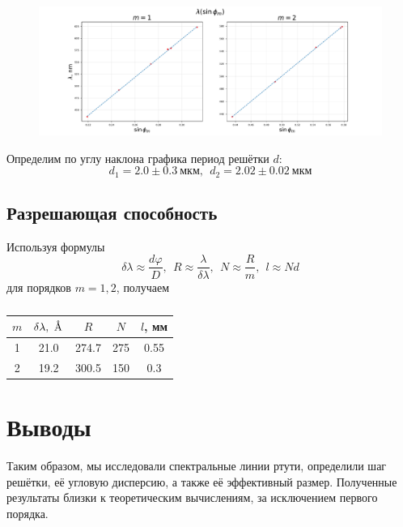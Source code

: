 \documentclass[a4paper,12pt]{article}
\newcommand{\angstrom}{\mbox{\normalfont\AA}} %
\begin{document}
\begin{figure}[h!]
    \centering
    \includegraphics[scale=0.4]{gr.pdf}
    \caption{}
\end{figure}

\begin{flushleft}
    \hspace*{2.5 mm}
    Определим по углу наклона графика период решётки $d$:
    \[d_1 = 2.0 \pm 0.3~\text{мкм},~~d_2 = 2.02 \pm 0.02~\text{мкм}\]
\end{flushleft}

\subsection{Разрешающая способность}

\begin{flushleft}
    \hspace*{2.5 mm}
    Используя формулы
    \[ \delta \lambda \approx \dfrac{d \varphi}{D}, ~~ R \approx \dfrac{\lambda}{\delta \lambda}, ~~ N \approx \dfrac{R}{m}, ~~ l \approx N d \]
    для порядков $m = 1, 2$, получаем
\end{flushleft}

\begin{table}[h!]
    \centering
    \caption{}
    \begin{tabular}{|c|c|c|c|c|}
        \hline
        $m$ & $\delta \lambda,~\angstrom$ & $R$ & $N$ & $l$, мм \\ \hline
        1 & 21.0 & 274.7 & 275 & 0.55 \\ \hline
        2 & 19.2 & 300.5 & 150 & 0.3 \\ \hline
    \end{tabular}
\end{table}

\section{Выводы}

\begin{flushleft}
    \hspace*{2.5 mm}
    Таким образом, мы исследовали спектральные линии ртути, определили шаг решётки, 
    её угловую дисперсию, а также её эффективный размер. Полученные результаты близки 
    к теоретическим вычислениям, за исключением первого порядка.
\end{flushleft}
\end{document}
